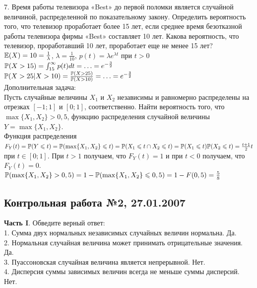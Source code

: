 \documentclass[12pt, a4paper]{article}\usepackage[]{graphicx}\usepackage[]{color}
\begin{document}
7.  Время работы телевизора «Best» до первой поломки является
случайной величиной, распределенной по показательному закону.
Определить вероятность того, что телевизор проработает более 15
лет, если среднее время безотказной работы телевизора фирмы «Best»
составляет 10 лет. Какова вероятность, что телевизор,
проработавший 10 лет, проработает еще не менее 15 лет? \\

$\E(X)=10=\frac{1}{\lambda}$, $\lambda=\frac{1}{10}$, $p(t)=\lambda
e^{\lambda t}$ при $t>0$ \\
$\P(X>15)=\int_{15}^{\infty}p(t)dt=\ldots=e^{-\frac{3}{2}}$ \\
$\P(X>25|X>10)=\frac{\P(X>25)}{\P(X>10)}=\ldots=e^{-\frac{3}{2}}$ \\

Дополнительная задача: \\
Пусть случайные величины $X_{1}$ и $X_{2}$ независимы и равномерно
распределены на отрезках $[-1;1]$ и $[0;1]$, соответственно. Найти
вероятность того, что $\max\{X_{1},X_{2}\}>0,5$, функцию
распределения случайной величины $Y=\max\{X_{1},X_{2}\}$. \\
Функция распределения $F_{Y}(t)=\P(Y\le t)=\P(\max\{X_{1},X_{2}\}\le
t)=\P(X_{1}\le t\cap X_{2}\le t)=\P(X_{1}\le t)\P(X_{2}\le
t)=\frac{t+1}{2}t$ при $t\in [0;1]$. При $t>1$ получаем, что
$F_{Y}(t)=1$ и при $t<0$ получаем, что $F_{Y}(t)=0$. \\
$\P(\max\{X_{1},X_{2}\}>0,5)=1-\P(\max\{X_{1},X_{2}\}\le
0,5)=1-F(0,5)=\frac{5}{8}$ \\




\subsection{Контрольная работа №2, 27.01.2007}

 \textbf{Часть I}. Обведите верный ответ: \\

1. Сумма двух нормальных независимых случайных величин нормальна.
Да. \\

2. Нормальная случайная величина может принимать отрицательные
значения. Да. \\

3. Пуассоновская случайная величина является непрерывной. Нет.
\\

4. Дисперсия суммы зависимых величин всегда не меньше суммы
дисперсий. Нет. \\
\end{document}
